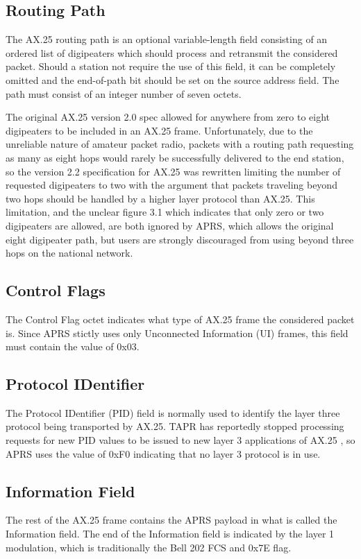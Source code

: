 \subsection{Routing Path}
\label{subsec:ax25RoutingPath}

The AX.25 routing path is an optional variable-length field consisting of an ordered list of
digipeaters which should process and retransmit the considered packet. Should a station not
require the use of this field, it can be completely omitted and the end-of-path bit should be
set on the source address field. The path must consist of an integer number of seven octets.

The original AX.25 version 2.0 spec allowed for anywhere from zero to eight digipeaters to
be included in an AX.25 frame. Unfortunately, due to the unreliable nature of amateur 
packet radio, packets with a routing path requesting as many as eight hops would rarely be 
successfully delivered to the end station, so the version 2.2 specification for AX.25 was
rewritten limiting the number of requested digipeaters to two with the argument that packets
traveling beyond two hops should be handled by a higher layer protocol than AX.25.
This limitation, and the unclear figure 3.1 which indicates that only zero or two digipeaters
are allowed, are both ignored by APRS, which allows the original eight digipeater path, but
users are strongly discouraged from using beyond three hops on the national network.

\subsection{Control Flags}

The Control Flag octet indicates what type of AX.25 frame the considered packet is. 
Since APRS stictly uses only Unconnected Information (UI) frames, this field must
contain the value of 0x03.

\subsection{Protocol IDentifier}

The Protocol IDentifier (PID) field is normally used to identify the layer three protocol
being transported by AX.25. TAPR has reportedly stopped processing requests for new PID
values to be issued to new layer 3 applications of AX.25 \cite{millernopid}, 
so APRS uses the value of
0xF0 indicating that no layer 3 protocol is in use.

\subsection{Information Field}

The rest of the AX.25 frame contains the APRS payload in what is called the Information field.
The end of the Information field is indicated by the layer 1 modulation, which is traditionally
the Bell 202 FCS and 0x7E flag.

